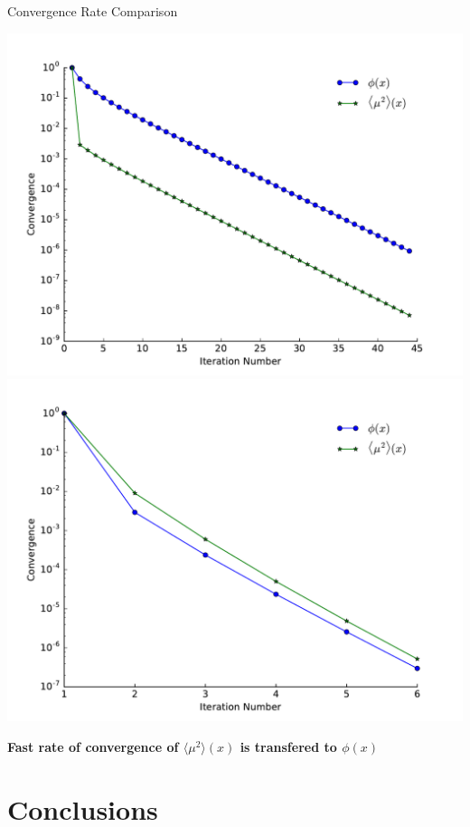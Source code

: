 \documentclass[10pt]{beamer}
\newcommand{\edd}{\langle \mu^2 \rangle}
\begin{document}
\begin{frame}{Convergence Rate Comparison}

    \begin{center}

        \includegraphics[width=.45\paperwidth]{converge_una.pdf}
        \includegraphics[width=.45\paperwidth]{converge_acc.pdf}

    \end{center}

    \vfill
    \centerline{\textbf{Fast rate of convergence of $\edd(x)$ is transfered to $\phi(x)$}}

\end{frame}

\section{Conclusions}
\end{document}
